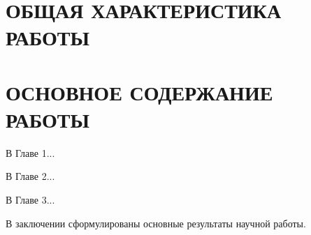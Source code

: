 
\section*{ОБЩАЯ ХАРАКТЕРИСТИКА РАБОТЫ}

\newcommand{\actuality}{\pdfbookmark[1]{Актуальность}{actuality}\textbf{Актуальность темы.}\enspace\ignorespaces}
\newcommand{\aim}{\pdfbookmark[1]{Цель}{aim}\textbf{Цель работы.}\enspace\ignorespaces}
\newcommand{\tasks}{\pdfbookmark[1]{Задачи}{tasks}\textbf{Задачи работы.}\enspace\ignorespaces}
\newcommand{\novelty}{\pdfbookmark[1]{Новизна}{novelty}\textbf{Научная новизна.}\enspace\ignorespaces}
\newcommand{\influence}{\pdfbookmark[1]{Значимость}{influence}\textbf{Теоретическая и практическая значимость.}\enspace\ignorespaces}
\newcommand{\methods}{\pdfbookmark[1]{Методы}{methods}\textbf{Методы и инструменты исследования.}\enspace\ignorespaces}
\newcommand{\defpositions}{\pdfbookmark[1]{Положения}{defpositions}\textbf{Основные положения, выносимые на защиту.}\enspace\ignorespaces}
\newcommand{\relevance}{\pdfbookmark[1]{Соответствие специальности}{relevance}\textbf{Соответствие специальность.}\enspace\ignorespaces}
\newcommand{\reliability}{\pdfbookmark[1]{Достоверность}{reliability}\textbf{Достоверность результатов проведённых исследований.}\enspace\ignorespaces}
\newcommand{\probation}{\pdfbookmark[1]{Апробация}{probation}\textbf{Апробация работы.}\enspace\ignorespaces}
\newcommand{\contribution}{\pdfbookmark[1]{Вклад}{contribution}\textbf{Личный вклад автора.}\enspace\ignorespaces}
\newcommand{\publications}{\pdfbookmark[1]{Публикации}{publications}\textbf{Публикации по теме диссертации.}\enspace\ignorespaces}




\section*{ОСНОВНОЕ СОДЕРЖАНИЕ РАБОТЫ}

В Главе 1...

В Главе 2...

В Главе 3...

В заключении сформулированы основные результаты научной работы.


